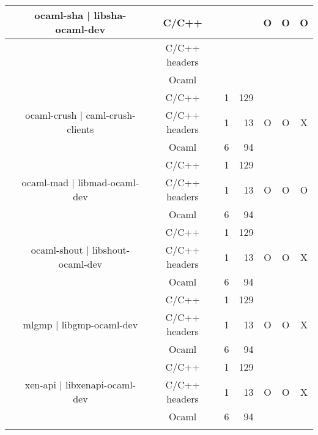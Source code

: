 \documentclass[11pt,a4paper]{article}
\begin{document}
\begin{table}[h,t]
\begin{tabular}{|>{\centering}m{3cm}| c|c|r|r| c| c|c|}
 &\multirow{3}{3cm}{ocaml-sha | libsha-ocaml-dev} & C/C++ &  &  & \multirow{3}{*}{O} & \multirow{3}{*}{O} & \multirow{3}{*}{O}\\
 \cline{3-5}
 & &                           C/C++ headers &  &  & & & \\
 \cline{3-5}
 & &                          Ocaml &  &  & & & \\
 \cline{2-8}



 &\multirow{3}{3cm}{ocaml-crush | caml-crush-clients} & C/C++ & 1 & 129 & \multirow{3}{*}{O} & \multirow{3}{*}{O} & \multirow{3}{*}{X}\\
\cline{3-5}
& &                           C/C++ headers & 1 & 13 & & & \\
\cline{3-5}
& &                          Ocaml & 6 & 94 & & & \\
\hline




 \multirow{18}{3cm}{bindings with C libraries}&\multirow{3}{3cm}{ocaml-mad | libmad-ocaml-dev} & C/C++ & 1 & 129 & \multirow{3}{*}{O} & \multirow{3}{*}{O} & \multirow{3}{*}{O}\\
\cline{3-5}
& &                           C/C++ headers & 1 & 13 & & & \\
\cline{3-5}
& &                          Ocaml & 6 & 94 & & & \\
\cline{2-8}



 &\multirow{3}{3cm}{ocaml-shout | libshout-ocaml-dev} & C/C++ & 1 & 129 & \multirow{3}{*}{O} & \multirow{3}{*}{O} & \multirow{3}{*}{X}\\
\cline{3-5}
& &                           C/C++ headers & 1 & 13 & & & \\
\cline{3-5}
& &                          Ocaml & 6 & 94 & & & \\
\cline{2-8}

 &\multirow{3}{3cm}{mlgmp | libgmp-ocaml-dev} & C/C++ & 1 & 129 & \multirow{3}{*}{O} & \multirow{3}{*}{O} & \multirow{3}{*}{X}\\
\cline{3-5}
& &                           C/C++ headers & 1 & 13 & & & \\
\cline{3-5}
& &                          Ocaml & 6 & 94 & & & \\
\cline{2-8}


 &\multirow{3}{3cm}{xen-api | libxenapi-ocaml-dev} & C/C++ & 1 & 129 & \multirow{3}{*}{O} & \multirow{3}{*}{O} & \multirow{3}{*}{X}\\
\cline{3-5}
& &                           C/C++ headers & 1 & 13 & & & \\
\cline{3-5}
& &                          Ocaml & 6 & 94 & & & \\
\cline{2-8}


\end{tabular}
\end{table}
\end{document}
